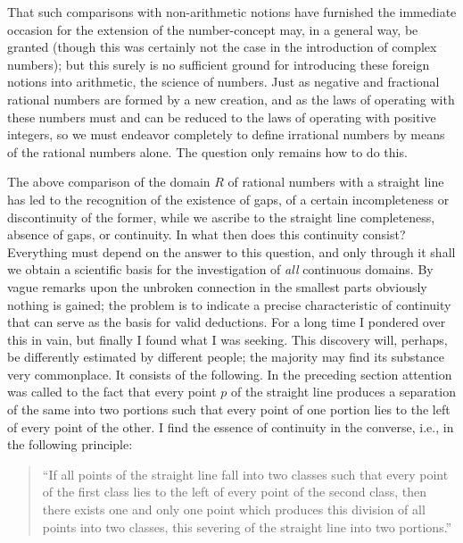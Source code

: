 \documentclass[oneside,12pt]{book}
\begin{document}
That such comparisons with non-arithmetic notions have furnished the immediate occasion for the extension of the number-concept may, in a general way, be granted (though this was certainly not the case in the introduction of complex numbers); but this surely is no sufficient ground for introducing these foreign notions into arithmetic, the science of numbers. Just as negative and fractional rational numbers are formed by a new creation, and as the laws of operating with these numbers must and can be reduced to the laws of operating with positive integers, so we must endeavor completely to define irrational numbers by means of the rational numbers alone. The question only remains how to do this. \par 

The above comparison of the domain $R$ of rational numbers with a straight line has led to the recognition of the existence of gaps, of a certain incompleteness or discontinuity of the former, while we ascribe to the straight line completeness, absence of gaps, or continuity. In what then does this continuity consist? Everything must depend on the answer to this question, and only through it shall we obtain a scientific basis for the investigation of \textit{all} continuous domains. By vague remarks upon the unbroken connection in the smallest parts obviously nothing is gained; the problem is to indicate a precise characteristic of continuity that can serve as the basis for valid deductions. For a long time I pondered over this in vain, but finally I found what I was seeking. This discovery will, perhaps, be differently estimated by different people; the majority may find its substance very commonplace. It consists of the following. In the preceding section attention was called to the fact that every point $p$ of the straight line produces a separation of the same into two portions such that every point  of one portion lies to the left of every point of the other. I find the essence of continuity in the converse, i.e., in the following principle: \par

\begin{quote}
    ``If all points of the straight line fall into two classes such that every point of the first class lies to the left of every point of the second class, then there exists one and only one point which produces this division of all points into two classes, this severing of the straight line into two portions.''
\end{quote}
\end{document}
